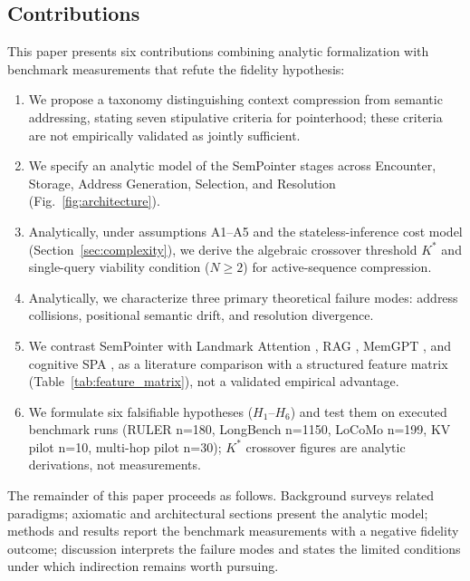 \documentclass[conference]{IEEEtran}
\begin{document}
\subsection{Contributions}
This paper presents six contributions combining analytic formalization with benchmark measurements that refute the fidelity hypothesis:
\begin{enumerate}\setlength{\itemsep}{0.5pt}\setlength{\parsep}{0pt}\setlength{\parskip}{0pt}\setlength{\topsep}{1.5pt}
    \item We propose a taxonomy distinguishing context compression from semantic addressing, stating seven stipulative criteria for pointerhood; these criteria are not empirically validated as jointly sufficient.
    \item We specify an analytic model of the SemPointer stages across Encounter, Storage, Address Generation, Selection, and Resolution (Fig.~\ref{fig:architecture}).
    \item Analytically, under assumptions A1--A5 and the stateless-inference cost model (Section~\ref{sec:complexity}), we derive the algebraic crossover threshold $K^*$ and single-query viability condition ($N \ge 2$) for active-sequence compression.
    \item Analytically, we characterize three primary theoretical failure modes: address collisions, positional semantic drift, and resolution divergence.
    \item We contrast SemPointer with Landmark Attention \cite{mohtashami2023landmark}, RAG \cite{lewis2020rag, cheng2024xrag}, MemGPT \cite{packer2023memgpt}, and cognitive SPA \cite{eliasmith2013mind}, as a literature comparison with a structured feature matrix (Table~\ref{tab:feature_matrix}), not a validated empirical advantage.
    \item We formulate six falsifiable hypotheses ($H_1$--$H_6$) and test them on executed benchmark runs (RULER n=180, LongBench n=1150, LoCoMo n=199, KV pilot n=10, multi-hop pilot n=30); $K^*$ crossover figures are analytic derivations, not measurements.
\end{enumerate}

The remainder of this paper proceeds as follows. Background surveys related paradigms; axiomatic and architectural sections present the analytic model; methods and results report the benchmark measurements with a negative fidelity outcome; discussion interprets the failure modes and states the limited conditions under which indirection remains worth pursuing.
\end{document}
